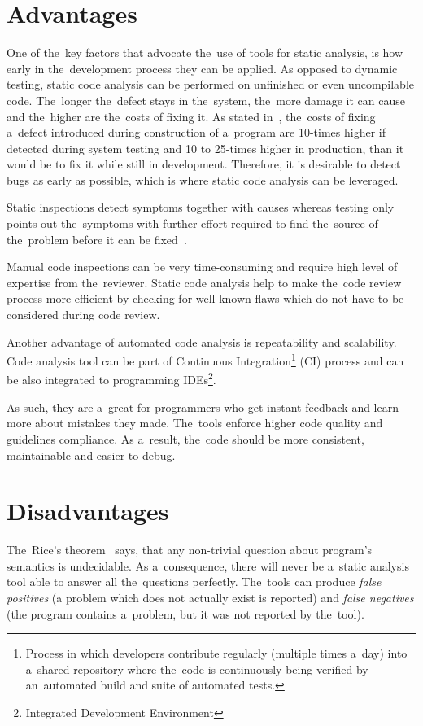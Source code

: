 \documentclass[
  digital, %
  table,   %
  lof,     %
  lot,     %
  oneside,
]{fithesis3}
\begin{document}
\section{Advantages}
One of the~key factors that advocate the~use of tools for static analysis, is how early in the~development process they can be applied. As opposed to dynamic testing, static code analysis can be performed on unfinished or even uncompilable code. The~longer the~defect stays in the~system, the~more damage it can cause and the~higher are the~costs of fixing it. As stated in~\cite[p. 29]{code-complete}, the~costs of fixing a~defect introduced during construction of a~program are 10-times higher if detected during system testing and 10 to 25-times higher in production, than it would be to fix it while still in development. Therefore, it is desirable to detect bugs as early as possible, which is where static code analysis can be leveraged.

Static inspections detect symptoms together with causes whereas testing only points out the~symptoms with further effort required to find the~source of the~problem before it can be fixed~\cite[p. 472]{code-complete}.

Manual code inspections can be very time-consuming and require high level of expertise from the~reviewer. Static code analysis help to make the~code review process more efficient by checking for well-known flaws which do not have to be considered during code review.

Another advantage of automated code analysis is repeatability and scalability. Code analysis tool can be part of Continuous Integration\footnote{Process in which developers contribute regularly (multiple times a~day) into a~shared repository where the~code is continuously being verified by an~automated build and suite of automated tests.} (CI) process and can be also integrated to programming IDEs\footnote{Integrated Development Environment}. 

As such, they are a~great for programmers who get instant feedback and learn more about mistakes they made. The~tools enforce higher code quality and guidelines compliance. As a~result, the~code should be more consistent, maintainable and easier to debug.
  
\section{Disadvantages}
The~Rice's theorem~\cite{direct-proofs-of-rices-theorem} says, that any non-trivial question about program's semantics is undecidable. As a~consequence, there will never be a~static analysis tool able to answer all the~questions perfectly. The~tools can produce \textit{false positives} (a problem which does not actually exist is reported) and \textit{false negatives} (the program contains a~problem, but it was not reported by the~tool).
\end{document}
